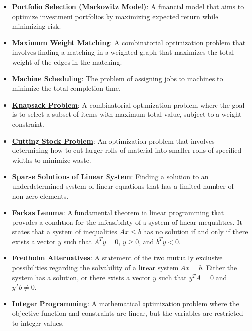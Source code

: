 \documentclass{article}%
\begin{document}
\begin{itemize}[leftmargin=*]
\item \href{https://www.math.purdue.edu/~yipn/421/2024-10-28-ApplsLinProg.pdf#page=9}{\textbf{Portfolio Selection (Markowitz Model)}}: A financial model that aims to optimize investment portfolios by maximizing expected return while minimizing risk.%
\item \href{https://www.math.purdue.edu/~yipn/421/2024-10-28-ApplsLinProg.pdf#page=19}{\textbf{Maximum Weight Matching}}: A combinatorial optimization problem that involves finding a matching in a weighted graph that maximizes the total weight of the edges in the matching.%
\item \href{https://www.math.purdue.edu/~yipn/421/2024-10-28-ApplsLinProg.pdf#page=22}{\textbf{Machine Scheduling}}: The problem of assigning jobs to machines to minimize the total completion time.%
\item \href{https://www.math.purdue.edu/~yipn/421/2024-10-28-ApplsLinProg.pdf#page=24}{\textbf{Knapsack Problem}}: A combinatorial optimization problem where the goal is to select a subset of items with maximum total value, subject to a weight constraint.%
\item \href{https://www.math.purdue.edu/~yipn/421/2024-10-28-ApplsLinProg.pdf#page=25}{\textbf{Cutting Stock Problem}}: An optimization problem that involves determining how to cut larger rolls of material into smaller rolls of specified widths to minimize waste.%
\item \href{https://www.math.purdue.edu/~yipn/421/2024-10-28-ApplsLinProg.pdf#page=30}{\textbf{Sparse Solutions of Linear System}}: Finding a solution to an underdetermined system of linear equations that has a limited number of non-zero elements.%
\item \href{https://www.math.purdue.edu/~yipn/421/2024-10-28-Farkas.pdf#page=1}{\textbf{Farkas Lemma}}: A fundamental theorem in linear programming that provides a condition for the infeasibility of a system of linear inequalities. It states that a system of inequalities $Ax \le b$ has no solution if and only if there exists a vector $y$ such that $A^T y = 0$, $y \ge 0$, and $b^T y < 0$.%
\item \href{https://www.math.purdue.edu/~yipn/421/2024-10-28-Farkas.pdf#page=3}{\textbf{Fredholm Alternatives}}: A statement of the two mutually exclusive possibilities regarding the solvability of a linear system $Ax = b$. Either the system has a solution, or there exists a vector $y$ such that $y^T A = 0$ and $y^T b \neq 0$.%
\item \href{https://www.math.purdue.edu/~yipn/421/2024-10-31-IntLinProg.pdf#page=1}{\textbf{Integer Programming}}: A mathematical optimization problem where the objective function and constraints are linear, but the variables are restricted to integer values.%

\end{itemize}
\end{document}
